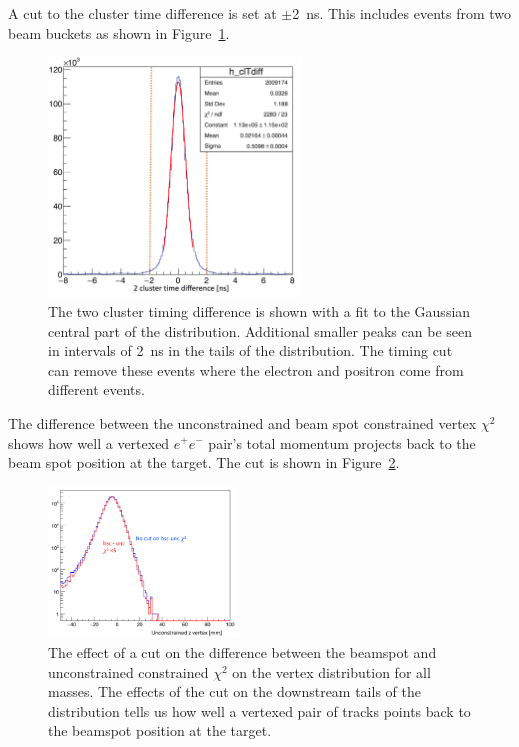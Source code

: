 A cut to the cluster time difference is set at $\pm$2~ns. This includes events from two beam buckets as shown in Figure~\ref{fig:cltdiff}.
\begin{figure}[H]
  \centering
      \includegraphics[width=0.6\textwidth]{pics/searching/cltdiff.png}
  \caption[Cut on the cluster pair time difference]{The two cluster timing difference is shown with a fit to the Gaussian central part of the distribution. Additional smaller peaks can be seen in intervals of 2~ns in the tails of the distribution. The timing cut can remove these events where the electron and positron come from different events.}
  \label{fig:cltdiff}
\end{figure} 
The difference between the unconstrained and beam spot constrained vertex $\chi^2$ shows how well a vertexed $e^+e^-$ pair's total momentum projects back to the beam spot position at the target. The cut is shown in Figure~\ref{fig:bmucut}.
\begin{figure}[H]
  \centering
      \includegraphics[width=0.45\textwidth]{pics/searching/bmuchi2.png}
  \caption[Vertex cut on the difference between beamspot and unconstrained $\chi^2$]{The effect of a cut on the difference between the beamspot and unconstrained constrained $\chi^2$ on the vertex distribution for all masses. The effects of the cut on the downstream tails of the distribution tells us how well a vertexed pair of tracks points back to the beamspot position at the target.}
  \label{fig:bmucut}
\end{figure} 
